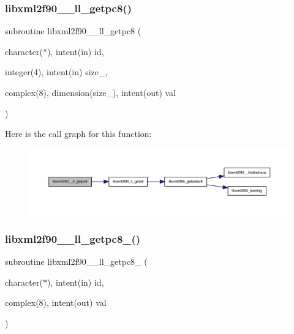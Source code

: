 \subsubsection{\texorpdfstring{libxml2f90\+\_\+\+\_\+ll\+\_\+getpc8()}{libxml2f90\_\_ll\_getpc8()}}
{\footnotesize\ttfamily subroutine libxml2f90\+\_\+\+\_\+ll\+\_\+getpc8 (\begin{DoxyParamCaption}\item[{character($\ast$), intent(in)}]{id,  }\item[{integer(4), intent(in)}]{size\+\_\+,  }\item[{complex(8), dimension(size\+\_\+), intent(out)}]{val }\end{DoxyParamCaption})}

Here is the call graph for this function\+:
\nopagebreak
\begin{figure}[H]
\begin{center}
\leavevmode
\includegraphics[width=350pt]{libxml2f90_8f90__pp_8f90_ac08cc5083f67fe974663dee0dd7066d5_cgraph}
\end{center}
\end{figure}
\mbox{\label{libxml2f90_8f90__pp_8f90_adf6af0ff041c73c9d338df8a99c88137}} 
\subsubsection{\texorpdfstring{libxml2f90\+\_\+\+\_\+ll\+\_\+getpc8\+\_\+()}{libxml2f90\_\_ll\_getpc8\_()}}
{\footnotesize\ttfamily subroutine libxml2f90\+\_\+\+\_\+ll\+\_\+getpc8\+\_\+ (\begin{DoxyParamCaption}\item[{character($\ast$), intent(in)}]{id,  }\item[{complex(8), intent(out)}]{val }\end{DoxyParamCaption})}

